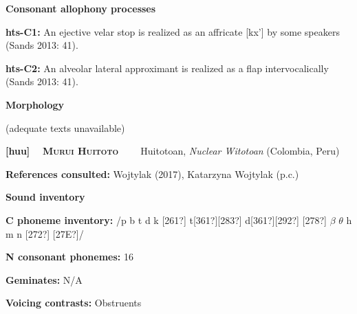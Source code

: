 \begin{styleBody}
\textbf{Consonant allophony processes}
\end{styleBody}

\begin{styleBody}
\textbf{hts-C1: }An ejective velar stop is realized as an affricate [kx’] by some speakers (Sands 2013: 41).
\end{styleBody}

\begin{styleBody}
\textbf{hts-C2: }An alveolar lateral approximant is realized as a flap intervocalically (Sands 2013: 41).
\end{styleBody}

\begin{styleBody}
\textbf{Morphology}
\end{styleBody}

\begin{styleBody}
(adequate texts unavailable)
\end{styleBody}

\clearpage\begin{styleBody}
\textbf{[huu] }\ \ \textbf{\textsc{Murui Huitoto\ \ }}\textbf{\ \ }Huitotoan, \textit{Nuclear Witotoan} (Colombia, Peru)
\end{styleBody}

\begin{styleBody}
\textbf{References consulted: }Wojtylak (2017), Katarzyna Wojtylak (p.c.)
\end{styleBody}

\begin{styleBody}
\textbf{Sound inventory}
\end{styleBody}

\begin{styleBody}
\textbf{C phoneme inventory:} /p b t d k [261?] t[361?][283?] d[361?][292?] [278?] $\beta $ $\theta $ h m n [272?] [27E?]/
\end{styleBody}

\begin{styleBody}
\textbf{N consonant phonemes:} 16
\end{styleBody}

\begin{styleBody}
\textbf{Geminates:} N/A
\end{styleBody}

\begin{styleBody}
\textbf{Voicing contrasts: }Obstruents
\end{styleBody}

